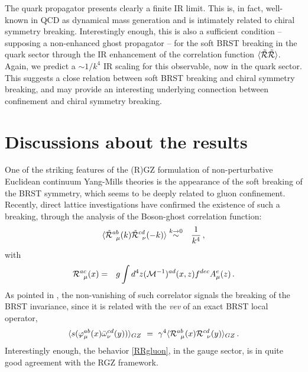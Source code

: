 The quark propagator presents clearly a finite IR limit. This is, in fact,  well-known in QCD
as dynamical mass generation and is intimately related to chiral symmetry breaking.
Interestingly enough, this is also a sufficient condition -- supposing a non-enhanced ghost
propagator -- for the soft BRST breaking in the quark sector through the IR enhancement of the
correlation function $\langle \tilde{\cal R}\tilde{\cal R}\rangle$. Again, we predict a $\sim
1/k^4$ IR scaling for this observable, now in the quark sector. This suggests a close relation
between soft BRST breaking and chiral symmetry breaking, and may provide an interesting
underlying connection between confinement and chiral symmetry breaking.









\section{Discussions about the results\label{conc4}}

One of the striking features of the (R)GZ formulation of non-perturbative Euclidean continuum
Yang-Mills theories is the appearance of the soft breaking of the BRST symmetry, which seems to
be deeply related to gluon confinement. Recently, direct lattice investigations
\cite{Cucchieri:2014via} have confirmed the existence of such a breaking, through the analysis
of the Boson-ghost correlation function:
\begin{eqnarray}
\langle \tilde {\cal R}^{ab}_{\;\;\mu}(k)\tilde {\cal
R}^{cd}_{\;\;\nu}(-k)\rangle&\stackrel{k\to 0}{\sim}&\frac{1}{k^4} \,,
\label{RRgluon}
\end{eqnarray}
with
\begin{eqnarray}
{\cal R}^{ac}_{\;\;\mu}(x)&=&g \int d^4z ({\cal M}^{-1})^{ad}(x,z) f^{dec}A^e_{\mu}(z)
\,.
\end{eqnarray}
As pointed in \cite{Cucchieri:2014via}, the non-vanishing of such correlator signals the
breaking of the BRST invariance, since it is related with the \emph{vev} of an exact BRST local
operator,
\begin{eqnarray}
\langle s(\varphi^{ab}_{\mu}(x)\bar{\omega}^{cd}_{\nu}(y))  \rangle_{GZ} ~=~ \gamma^{4} \langle
{\cal R}^{ab}_{\;\;\mu}(x) {\cal R}^{cd}_{\;\;\nu}(y)\rangle_{GZ}\,.
\end{eqnarray}
Interestingly enough, the behavior \eqref{RRgluon}, in the gauge sector, is in quite good agreement with the RGZ framework.

